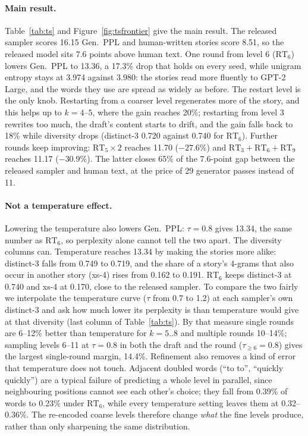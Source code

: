 \documentclass[10pt]{article}
\newcommand{\RT}[1]{\mathrm{RT}_{#1}}
\begin{document}
\paragraph{Main result.} Table~\ref{tab:ts} and Figure~\ref{fig:tsfrontier} give the main result. The released sampler scores 16.15 Gen.\ PPL and human-written stories score 8.51, so the released model sits 7.6 points above human text. One round from level 6 ($\RT{6}$) lowers Gen.\ PPL to 13.36, a 17.3\% drop that holds on every seed, while unigram entropy stays at 3.974 against 3.980: the stories read more fluently to GPT-2 Large, and the words they use are spread as widely as before. The restart level is the only knob. Restarting from a coarser level regenerates more of the story, and this helps up to $k{=}4$--$5$, where the gain reaches 20\%; restarting from level 3 rewrites too much, the draft's content starts to drift, and the gain falls back to 18\% while diversity drops (distinct-3 0.720 against 0.740 for $\RT{6}$). Further rounds keep improving: $\RT{5}{\times}2$ reaches 11.70 ($-27.6\%$) and $\RT{3}{+}\RT{6}{+}\RT{9}$ reaches 11.17 ($-30.9\%$). The latter closes 65\% of the 7.6-point gap between the released sampler and human text, at the price of 29 generator passes instead of 11.

\paragraph{Not a temperature effect.} Lowering the temperature also lowers Gen.\ PPL: $\tau{=}0.8$ gives 13.34, the same number as $\RT{6}$, so perplexity alone cannot tell the two apart. The diversity columns can. Temperature reaches 13.34 by making the stories more alike: distinct-3 falls from 0.749 to 0.719, and the share of a story's 4-grams that also occur in another story (xs-4) rises from 0.162 to 0.191. $\RT{6}$ keeps distinct-3 at 0.740 and xs-4 at 0.170, close to the released sampler. To compare the two fairly we interpolate the temperature curve ($\tau$ from 0.7 to 1.2) at each sampler's own distinct-3 and ask how much lower its perplexity is than temperature would give at that diversity (last column of Table~\ref{tab:ts}). By that measure single rounds are 6--12\% better than temperature for $k{=}5..8$ and multiple rounds 10--14\%; sampling levels 6--11 at $\tau{=}0.8$ in both the draft and the round ($\tau_{\geq 6}{=}0.8$) gives the largest single-round margin, 14.4\%. Refinement also removes a kind of error that temperature does not touch. Adjacent doubled words (``to to'', ``quickly quickly'') are a typical failure of predicting a whole level in parallel, since neighbouring positions cannot see each other's choice; they fall from 0.39\% of words to 0.23\% under $\RT{6}$, while every temperature setting leaves them at 0.32--0.36\%. The re-encoded coarse levels therefore change \emph{what} the fine levels produce, rather than only sharpening the same distribution.
\end{document}
